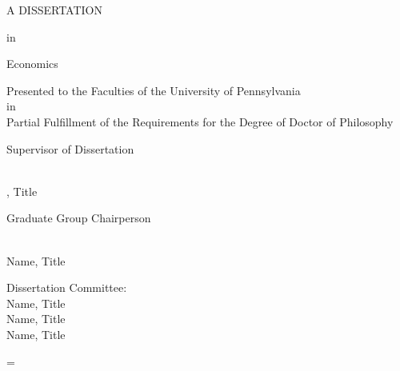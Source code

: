 \large\newlength{\oldparskip}\setlength\oldparskip{\parskip}\parskip=0.2in
\thispagestyle{empty}

\begin{center}
	\LARGE \thetitle

	\large \theauthor

	\Large A DISSERTATION

	\large in

	\Large Economics

	\large Presented to the Faculties of the University of Pennsylvania\\
	\normalsize in\\
	\large Partial Fulfillment of the Requirements for the Degree of Doctor of Philosophy

	\theyear
\end{center}

\large

\bigskip
\noindent Supervisor of Dissertation
\par\noindent\makebox[3.5in]{\hrulefill} \\
\theadvisor, Title

\bigskip
\noindent Graduate Group Chairperson
\par\noindent\makebox[3.5in]{\hrulefill} \\
Name, Title

\bigskip
\noindent
Dissertation Committee:\\
\normalsize
Name, Title\\
Name, Title\\
Name, Title
\vspace*{\fill}

\normalsize\parskip=\oldparskip
